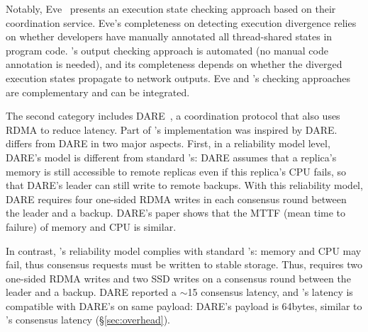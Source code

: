
Notably, Eve~\cite{eve:osdi12} presents an execution state checking approach 
based on their \paxos coordination service. Eve's completeness on detecting 
execution divergence relies on whether developers have manually annotated all 
thread-shared states in program code. \xxx's output checking approach is 
automated (no manual code annotation is needed), and its completeness depends on 
whether the diverged execution states propagate to network outputs. Eve and 
\xxx's checking approaches are complementary and can be integrated.

The second category includes DARE~\cite{dare:hpdc15}, a coordination protocol 
that also uses RDMA to reduce latency. Part of \xxx's implementation was 
inspired by DARE. \xxx differs from DARE in two major aspects. First, in a 
reliability model level, DARE's model is different from standard \paxos's: DARE 
assumes that a replica's memory is still accessible to remote replicas even if 
this replica's CPU fails, so that DARE's leader can still write to remote 
backups. With this reliability model, DARE requires four one-sided RDMA writes 
in each consensus round between the leader and a backup. DARE's paper shows that 
the MTTF (mean time to failure) of memory and CPU is similar.

In contrast, \xxx's reliability model complies with standard \paxos's: memory 
and CPU may fail, thus consensus requests must be written to stable storage. 
Thus, \xxx requires two one-sided RDMA writes and two SSD writes on a consensus 
round between the leader and a backup. DARE reported a $\sim$15 \us consensus 
latency, and \xxx's latency is compatible with DARE's on same payload: DARE's 
payload is 64bytes, similar to \xxx's \redis consensus latency 
(\S\ref{sec:overhead}).

